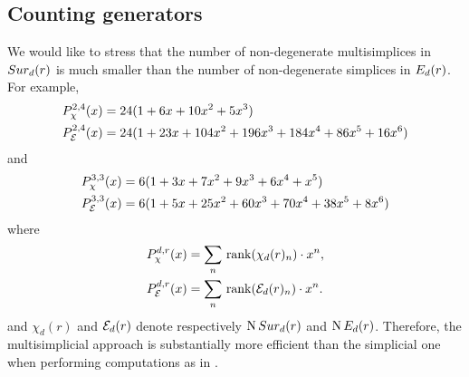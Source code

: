 \subsection{Counting generators}

We would like to stress that the number of non-degenerate multisimplices in $Sur_d(r)$ is much smaller than the number of non-degenerate simplices in $E_d(r)$.
For example,
\begin{align*}
	& P_\chi^{2,4}(x) = 24(1+6x+10x^2+5x^3) \\
	& P_{\mathcal{E}}^{2,4}(x) = 24(1+23x+104x^2+196x^3+184x^4+86x^5+16x^6)
\end{align*}
and
\begin{align*}
	& P_\chi^{3,3}(x) = 6(1+3x+7x^2+9x^3+6x^4+x^5) \\
	& P_{\mathcal{E}}^{3,3}(x) = 6(1+5x+25x^2+60x^3+70x^4+38x^5+8x^6 )
\end{align*}
where
\begin{align*}
	P_\chi^{d,r}(x) &= \sum_n \,\operatorname{rank}(\chi_d(r)_n) \cdot x^n, \\
	P_{\mathcal{E}}^{d,r}(x)  &= \sum_n \,\operatorname{rank}(\mathcal{E}_d(r)_n)  \cdot x^n.
\end{align*}
and $\chi_d(r)$ and $\mathcal{E}_d(r)$ denote respectively $\operatorname{N}Sur_{d}(r)$ and $\operatorname{N}E_d(r)$.
Therefore, the multisimplicial approach is substantially more efficient than the simplicial
one when performing computations as in \cite{salvatore2020planarnonformality}.